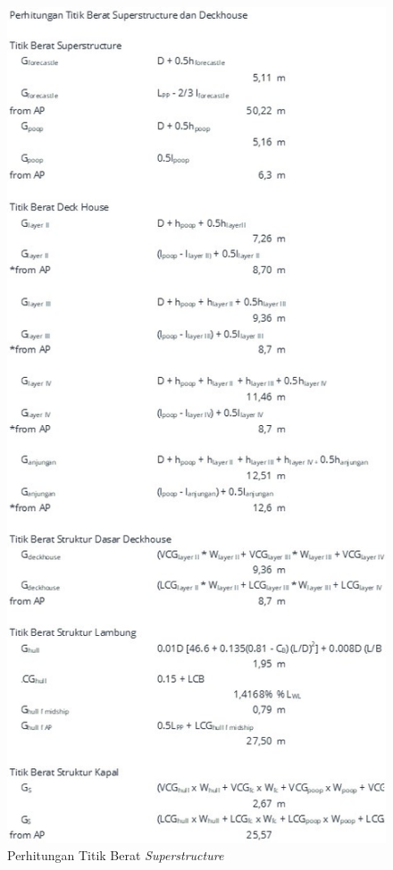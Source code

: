 \begin{figure}[!ht]
    \centering
    \includegraphics[width=0.95\linewidth,height=0.95\textheight,keepaspectratio]{lampiran/deskap-8.jpg}
    \caption*{Perhitungan Titik Berat \emph{Superstructure}}
\end{figure}


